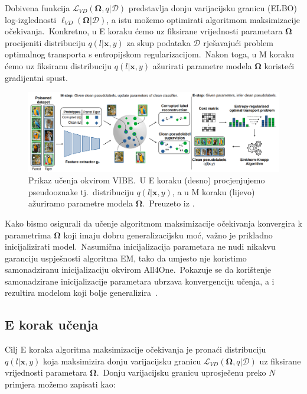 \documentclass[diplomskirad]{fer}
\begin{document}
Dobivena funkcija $\mathcal{L}_{VD}(\bm{\Omega}, q | \mathcal{D})$ predstavlja donju varijacijsku granicu (ELBO) log-izglednosti $\ell_{VD}(\bm{\Omega}|\mathcal{D})$, a istu možemo optimirati algoritmom maksimizacije očekivanja.\ 
Konkretno, u E koraku ćemo uz fiksirane vrijednosti parametara $\bm{\Omega}$ procijeniti distribuciju $q(l | \bm{x}, y)$ za skup podataka $\mathcal{D}$ rješavajući problem optimalnog transporta s entropijskom regularizacijom.\ 
Nakon toga, u M koraku ćemo uz fiksiranu distribuciju $q(l | \bm{x}, y)$ ažurirati parametre modela $\bm{\Omega}$ koristeći gradijentni spust.\ 

\begin{figure}[h]
  \centering
  \includegraphics[scale=0.6]{./Slike/vibe.png}
  \caption{Prikaz učenja okvirom VIBE.\ U E koraku (desno) procjenjujemo pseudooznake tj.\ distribuciju $q(l | \bm{x}, y)$, a u M koraku (lijevo) ažuriramo parametre modela $\bm{\Omega}$.\ Preuzeto iz \cite{sabolic2025seal}.}
  \label{fig:vibe}
\end{figure}

Kako bismo osigurali da učenje algoritmom maksimizacije očekivanja konvergira k parametrima $\bm{\Omega}$ koji imaju dobru generalizacijsku moć, važno je prikladno inicijalizirati model.\ 
Nasumična inicijalizacija parametara ne nudi nikakvu garanciju uspješnosti algoritma EM, tako da umjesto nje koristimo samonadziranu inicijalizaciju okvirom All4One.\ 
Pokazuje se da korištenje samonadzirane inicijalizacije parametara ubrzava konvergenciju učenja, a i rezultira modelom koji bolje generalizira~\cite{sabolic2025seal}.\

\subsection{E korak učenja}
\label{sub:e_step}

Cilj E koraka algoritma maksimizacije očekivanja je pronaći distribuciju $q(l | \bm{x}, y)$ koja maksimizira donju varijacijsku granicu $\mathcal{L}_{VD}(\bm{\Omega}, q | \mathcal{D})$ uz fiksirane vrijednosti parametara $\bm{\Omega}$.\ 
Donju varijacijsku granicu uprosječenu preko $N$ primjera možemo zapisati kao:
\end{document}
